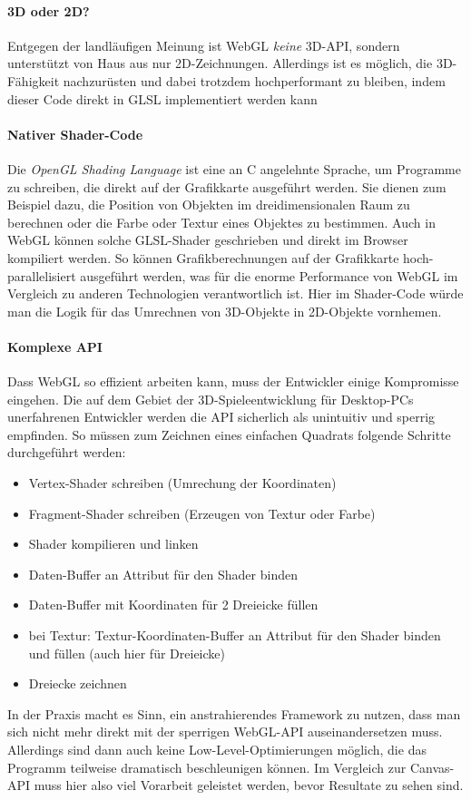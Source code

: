 \documentclass[a4paper, 12pt]{article}
\begin{document}
\paragraph{3D oder 2D?} Entgegen der landläufigen Meinung ist WebGL \emph{keine} 3D-API, sondern unterstützt von Haus aus nur 2D-Zeichnungen. Allerdings ist es möglich, die 3D-Fähigkeit nachzurüsten und dabei trotzdem hochperformant zu bleiben, indem dieser Code direkt in GLSL implementiert werden kann
\paragraph{Nativer Shader-Code} Die \emph{OpenGL Shading Language} ist eine an C angelehnte Sprache, um Programme zu schreiben, die direkt auf der Grafikkarte ausgeführt werden. Sie dienen zum Beispiel dazu, die Position von Objekten im dreidimensionalen Raum zu berechnen oder die Farbe oder Textur eines Objektes zu bestimmen. Auch in WebGL können solche GLSL-Shader geschrieben und direkt im Browser kompiliert werden. So können Grafikberechnungen auf der Grafikkarte hoch-parallelisiert ausgeführt werden, was für die enorme Performance von WebGL im Vergleich zu anderen Technologien verantwortlich ist. Hier im Shader-Code würde man die Logik für das Umrechnen von 3D-Objekte in 2D-Objekte vornhemen.
\paragraph{Komplexe API} Dass WebGL so effizient arbeiten kann, muss der Entwickler einige Kompromisse eingehen. Die auf dem Gebiet der 3D-Spieleentwicklung für Desktop-PCs unerfahrenen Entwickler werden die API sicherlich als unintuitiv und sperrig empfinden. So müssen zum Zeichnen eines einfachen Quadrats folgende Schritte durchgeführt werden:
\begin{itemize}
	\item Vertex-Shader schreiben (Umrechung der Koordinaten)
	\item Fragment-Shader schreiben (Erzeugen von Textur oder Farbe)
	\item Shader kompilieren und linken
	\item Daten-Buffer an Attribut für den Shader binden
	\item Daten-Buffer mit Koordinaten für 2 Dreieicke füllen
	\item bei Textur: Textur-Koordinaten-Buffer an Attribut für den Shader binden und füllen (auch hier für Dreieicke)
	\item Dreiecke zeichnen
\end{itemize}
In der Praxis macht es Sinn, ein anstrahierendes Framework zu nutzen, dass man sich nicht mehr direkt mit der sperrigen WebGL-API auseinandersetzen muss. Allerdings sind dann auch keine Low-Level-Optimierungen möglich, die das Programm teilweise dramatisch beschleunigen können.
Im Vergleich zur Canvas-API muss hier also viel Vorarbeit geleistet werden, bevor Resultate zu sehen sind.
\end{document}
